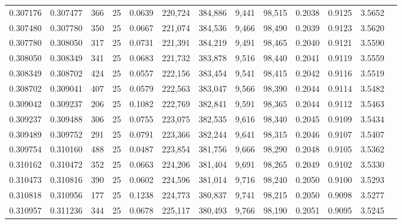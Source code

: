\begin{tabular}{rrrrrrrrrrrrr}
0.307176 & 0.307477 &   366 &  25 &                                     0.0639 & 220,724 & 384,886 &   9,441 &  98,515 & 0.2038 & 0.9125 & 3.5652 \\
0.307480 & 0.307780 &   350 &  25 &                                     0.0667 & 221,074 & 384,536 &   9,466 &  98,490 & 0.2039 & 0.9123 & 3.5620 \\
0.307780 & 0.308050 &   317 &  25 &                                     0.0731 & 221,391 & 384,219 &   9,491 &  98,465 & 0.2040 & 0.9121 & 3.5590 \\
0.308050 & 0.308349 &   341 &  25 &                                     0.0683 & 221,732 & 383,878 &   9,516 &  98,440 & 0.2041 & 0.9119 & 3.5559 \\
0.308349 & 0.308702 &   424 &  25 &                                     0.0557 & 222,156 & 383,454 &   9,541 &  98,415 & 0.2042 & 0.9116 & 3.5519 \\
0.308702 & 0.309041 &   407 &  25 &                                     0.0579 & 222,563 & 383,047 &   9,566 &  98,390 & 0.2044 & 0.9114 & 3.5482 \\
0.309042 & 0.309237 &   206 &  25 &                                     0.1082 & 222,769 & 382,841 &   9,591 &  98,365 & 0.2044 & 0.9112 & 3.5463 \\
0.309237 & 0.309488 &   306 &  25 &                                     0.0755 & 223,075 & 382,535 &   9,616 &  98,340 & 0.2045 & 0.9109 & 3.5434 \\
0.309489 & 0.309752 &   291 &  25 &                                     0.0791 & 223,366 & 382,244 &   9,641 &  98,315 & 0.2046 & 0.9107 & 3.5407 \\
0.309754 & 0.310160 &   488 &  25 &                                     0.0487 & 223,854 & 381,756 &   9,666 &  98,290 & 0.2048 & 0.9105 & 3.5362 \\
0.310162 & 0.310472 &   352 &  25 &                                     0.0663 & 224,206 & 381,404 &   9,691 &  98,265 & 0.2049 & 0.9102 & 3.5330 \\
0.310473 & 0.310816 &   390 &  25 &                                     0.0602 & 224,596 & 381,014 &   9,716 &  98,240 & 0.2050 & 0.9100 & 3.5293 \\
0.310818 & 0.310956 &   177 &  25 &                                     0.1238 & 224,773 & 380,837 &   9,741 &  98,215 & 0.2050 & 0.9098 & 3.5277 \\
0.310957 & 0.311236 &   344 &  25 &                                     0.0678 & 225,117 & 380,493 &   9,766 &  98,190 & 0.2051 & 0.9095 & 3.5245 \\

\end{tabular}
